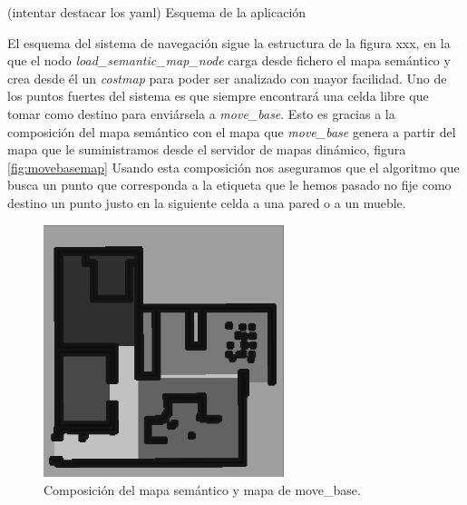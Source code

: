 (intentar destacar los yaml)
{Esquema de la aplicación}

El esquema del sistema de navegación sigue la estructura de la figura xxx, en la que el nodo \textit{load\_semantic\_map\_node} carga desde fichero el mapa semántico y crea desde él un \textit{costmap} para poder ser analizado con mayor facilidad. 
Uno de los puntos fuertes del sistema es que siempre encontrará una celda libre que tomar como destino para enviársela a 
\textit{move\_base}. Esto es gracias a la composición del mapa semántico con el mapa que \textit{move\_base} genera a partir del mapa que le suministramos desde el servidor de mapas dinámico, figura \ref{fig:movebasemap}
Usando esta composición nos aseguramos que el algoritmo que busca un punto que corresponda a la etiqueta que le hemos pasado no fije como destino un punto justo en la siguiente celda a una pared o a un mueble.
\begin{figure} [hbtp]
  \begin{center}
    \includegraphics[width=7cm]{img/cap6/semanticmapcomp}
  \end{center}
  \caption{Composición del mapa semántico y mapa de move\_base.}
  \label{fig:semanticmapcomp}
\end{figure}
